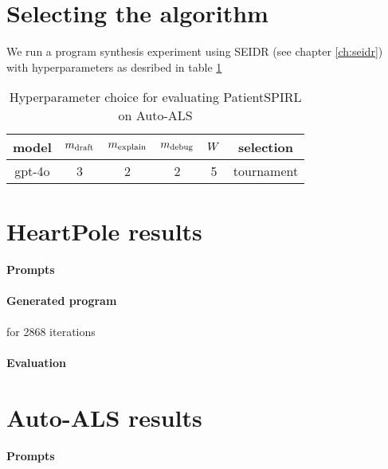 \newpage
\section{Selecting the algorithm}

We run a program synthesis experiment using SEIDR (see chapter \ref{ch:seidr}) with hyperparameters as desribed in table \ref{tab:patientspirl-auto-als}

\begin{table}
    \centering
    \begin{tabular}{|c|c|c|c|c|c|}
        model & $m_\text{draft}$ & $m_\text{explain}$ & $m_\text{debug}$ & $W$ & selection \\
        \midrule
        gpt-4o & 3 & 2 & 2 & 5 & tournament
    \end{tabular}
    \caption{Hyperparameter choice for evaluating PatientSPIRL on Auto-ALS}
    \label{tab:patientspirl-auto-als}
\end{table}

\newpage
\section{HeartPole results}

\paragraph{Prompts}



\paragraph{Generated program}





for 2868 iterations

\paragraph{Evaluation}

\newpage
\section{Auto-ALS results}

\paragraph{Prompts}

